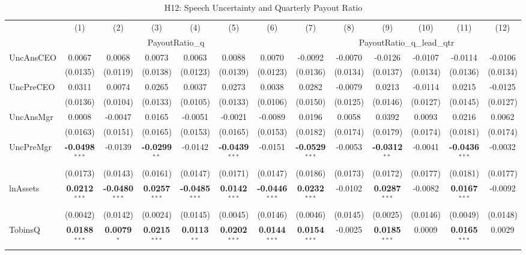 \documentclass[11pt,a4paper]{article}
\begin{document}
\begin{table}[htbp]
\centering
\caption{H12: Speech Uncertainty and Quarterly Payout Ratio}
\label{tab:h12}
\scriptsize
\begin{tabular}{lcccccccccccc}
\toprule
 & (1) & (2) & (3) & (4) & (5) & (6) & (7) & (8) & (9) & (10) & (11) & (12) \\
 & \multicolumn{6}{c}{PayoutRatio\_q} & \multicolumn{6}{c}{PayoutRatio\_q\_lead\_qtr} \\
\cmidrule(lr){2-7} \cmidrule(lr){8-13}
\midrule
UncAnsCEO & 0.0067 & 0.0068 & 0.0073 & 0.0063 & 0.0088 & 0.0070 & -0.0092 & -0.0070 & -0.0126 & -0.0107 & -0.0114 & -0.0106 \\
 & (0.0135) & (0.0119) & (0.0138) & (0.0123) & (0.0139) & (0.0123) & (0.0136) & (0.0134) & (0.0137) & (0.0134) & (0.0136) & (0.0134) \\
UncPreCEO & 0.0311 & 0.0074 & 0.0265 & 0.0037 & 0.0273 & 0.0038 & 0.0282 & -0.0079 & 0.0213 & -0.0114 & 0.0215 & -0.0125 \\
 & (0.0136) & (0.0104) & (0.0133) & (0.0105) & (0.0133) & (0.0106) & (0.0150) & (0.0125) & (0.0146) & (0.0127) & (0.0145) & (0.0127) \\
UncAnsMgr & 0.0008 & -0.0047 & 0.0165 & -0.0051 & -0.0021 & -0.0089 & 0.0196 & 0.0058 & 0.0392 & 0.0093 & 0.0216 & 0.0062 \\
 & (0.0163) & (0.0151) & (0.0165) & (0.0153) & (0.0165) & (0.0153) & (0.0182) & (0.0174) & (0.0179) & (0.0174) & (0.0181) & (0.0174) \\
UncPreMgr & \textbf{-0.0498}$^{***}$ & -0.0139 & \textbf{-0.0299}$^{**}$ & -0.0142 & \textbf{-0.0439}$^{***}$ & -0.0151 & \textbf{-0.0529}$^{***}$ & -0.0053 & \textbf{-0.0312}$^{**}$ & -0.0041 & \textbf{-0.0436}$^{***}$ & -0.0032 \\
 & (0.0173) & (0.0143) & (0.0161) & (0.0147) & (0.0171) & (0.0147) & (0.0186) & (0.0173) & (0.0172) & (0.0177) & (0.0181) & (0.0177) \\
\midrule
lnAssets & \textbf{0.0212}$^{***}$ & \textbf{-0.0480}$^{***}$ & \textbf{0.0257}$^{***}$ & \textbf{-0.0485}$^{***}$ & \textbf{0.0142}$^{***}$ & \textbf{-0.0446}$^{***}$ & \textbf{0.0232}$^{***}$ & -0.0102 & \textbf{0.0287}$^{***}$ & -0.0082 & \textbf{0.0167}$^{***}$ & -0.0092 \\
 & (0.0042) & (0.0142) & (0.0024) & (0.0145) & (0.0045) & (0.0146) & (0.0046) & (0.0145) & (0.0025) & (0.0146) & (0.0049) & (0.0148) \\
TobinsQ & \textbf{0.0188}$^{***}$ & \textbf{0.0079}$^{*}$ & \textbf{0.0215}$^{***}$ & \textbf{0.0113}$^{**}$ & \textbf{0.0202}$^{***}$ & \textbf{0.0144}$^{***}$ & \textbf{0.0154}$^{***}$ & -0.0025 & \textbf{0.0185}$^{***}$ & 0.0009 & \textbf{0.0165}$^{***}$ & 0.0029 \\

\end{tabular}
\end{table}
\end{document}
